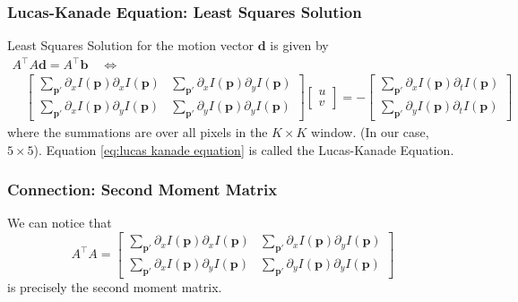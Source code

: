 \documentclass[11pt]{article}
\newcommand{\bb}{\mathbf{b}}
\newcommand{\bd}{\mathbf{d}}
\newcommand{\bp}{\mathbf{p}}
\begin{document}
\subsubsection{Lucas-Kanade Equation: Least Squares Solution} Least Squares Solution for the motion vector $\bd$ is given by
\begin{multline}
	A^\top A \bd = A^\top\bb \quad\iff \\ \quad \left[\begin{array}{cc}
		\sum_{\bp '} \partial_x I(\bp) \partial_x I(\bp) & \sum_{\bp '} \partial_x I(\bp) \partial_y I(\bp) \\
		\sum_{\bp '} \partial_x I(\bp) \partial_y I(\bp) & \sum_{\bp '} \partial_y I(\bp) \partial_y I(\bp)
		\end{array}\right]\left[\begin{array}{l}
		u \\
		v
		\end{array}\right] =-\left[\begin{array}{c}
		\sum_{\bp '} \partial_x I(\bp) \partial_t I(\bp) \\
		\sum_{\bp '} \partial_y I(\bp) \partial_t I(\bp)
	\end{array}\right]\label{eq:lucas kanade equation}
\end{multline}
where the summations are over all pixels in the $K \times K$ window. (In our case, $5\times 5$). Equation \ref{eq:lucas kanade equation} is called the Lucas-Kanade Equation. 
\subsubsection{Connection: Second Moment Matrix}
We can notice that 
\begin{equation}
	A^\top A = \left[
		\begin{array}{cc}
			\sum_{\bp '} \partial_x I(\bp) \partial_x I(\bp) & \sum_{\bp '} \partial_x 	I(\bp) 	\partial_y I(\bp) \\
			\sum_{\bp '} \partial_x I(\bp) \partial_y I(\bp) & \sum_{\bp '} \partial_y I(\bp) 	\partial_y I(\bp)
		\end{array}
	\right]
\end{equation}
is precisely the second moment matrix. 
\end{document}
